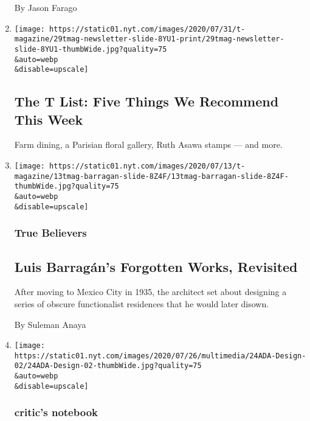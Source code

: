 \begin{enumerate}
  By Jason Farago
\item
  \href{/2020/07/30/t-magazine/the-t-list-five-things-we-recommend-this-week.html}{}

  \texttt{[image: https://static01.nyt.com/images/2020/07/31/t-magazine/29tmag-newsletter-slide-8YU1-print/29tmag-newsletter-slide-8YU1-thumbWide.jpg?quality=75\\\&auto=webp\\\&disable=upscale]}

  \hypertarget{the-t-list-five-things-we-recommend-this-week}{%
  \subsection{The T List: Five Things We Recommend This
  Week}\label{the-t-list-five-things-we-recommend-this-week}}

  Farm dining, a Parisian floral gallery, Ruth Asawa stamps --- and
  more.
\item
  \href{/2020/07/24/t-magazine/luis-barragan.html}{}

  \texttt{[image: https://static01.nyt.com/images/2020/07/13/t-magazine/13tmag-barragan-slide-8Z4F/13tmag-barragan-slide-8Z4F-thumbWide.jpg?quality=75\\\&auto=webp\\\&disable=upscale]}

  \hypertarget{true-believers}{%
  \subsubsection{True Believers}\label{true-believers}}

  \hypertarget{luis-barraguxe1ns-forgotten-works-revisited}{%
  \subsection{Luis Barragán's Forgotten Works,
  Revisited}\label{luis-barraguxe1ns-forgotten-works-revisited}}

  After moving to Mexico City in 1935, the architect set about designing
  a series of obscure functionalist residences that he would later
  disown.

  By Suleman Anaya
\item
  \href{/2020/07/20/arts/disabilities-architecture-design.html}{}

  \texttt{[image: https://static01.nyt.com/images/2020/07/26/multimedia/24ADA-Design-02/24ADA-Design-02-thumbWide.jpg?quality=75\\\&auto=webp\\\&disable=upscale]}

  \hypertarget{critics-notebook-1}{%
  \subsubsection{critic's notebook}\label{critics-notebook-1}}


\end{enumerate}
